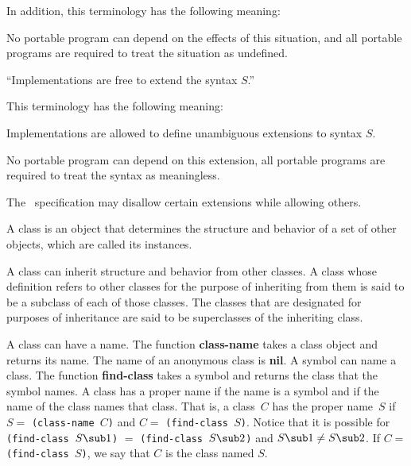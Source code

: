 \endlist

In addition, this terminology has the following meaning:

\beginlist

\item{\bull} No portable program can depend on the effects of this
situation, and all portable programs are required to treat the situation
as undefined.

\endlist

``Implementations are free to extend the syntax $S$\negthinspace.''

This terminology has the following meaning:

\beginlist

\item{\bull} Implementations are allowed to define unambiguous extensions
to syntax $S$\negthinspace.

\item{\bull} No portable program can depend on this extension,
all portable programs are required to treat the syntax
as meaningless.

\endlist

The \CLOS\ specification may disallow certain extensions while allowing others.

\endSection%


A {\bit class\/} is an object that determines the structure and behavior 
of a set of other objects, which are called its {\bit instances}.   

A class can inherit structure and behavior from other classes.  
A class whose definition refers to other classes for the purpose of
inheriting from them is said to be a {\bit subclass\/} of each of
those classes.  The classes that are designated for purposes of
inheritance are said to be {\bit superclasses\/}
of the inheriting class.

A class can have a {\bit name}. The function {\bf class-name} takes a
class object and returns its name. The name of an anonymous class is
{\bf nil}.  A symbol can {\bit name\/} a class.  The function {\bf
find-class} takes a symbol and returns the class that the symbol
names. A class has a {\bit proper name\/} if the name is a symbol
and if the name of the class
names that class.  That is, a class~$C$ has the {\bit proper
name\/}~$S$ if $S=$ {\tt (class-name $C$)} and $C=$ {\tt (find-class
$S$)}.  Notice that it is possible for {\tt (find-class $S\sub 1$)}
$=$ {\tt (find-class $S\sub 2$)} and $S\sub 1\neq S\sub 2$.
If $C=$ {\tt (find-class $S$)}, we say that $C$ is the {\bit class named}
$S$.

